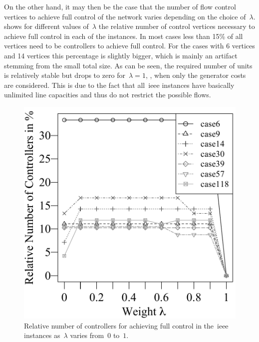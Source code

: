 On the other hand, it may then be the case that the number of flow control
vertices to achieve full control of the network varies depending on the choice
of~$\lambda$.  shows for different
values of~$\lambda$ the relative number of control vertices necessary to achieve
full control in each of the instances. In most cases less than 15\% of all
vertices need to be controllers to achieve full control.  For the cases with 6
vertices and 14 vertices this percentage is slightly bigger, which is mainly an
artifact stemming from the small total size.  As can be seen, the required
number of units is relatively stable but drops to zero for~$\lambda = 1$, \ie,
when only the generator costs are considered. This is due to the fact that
all~\gls{ieee} instances have basically unlimited line capacities and thus
do not restrict the possible flows.

\begin{figure}[tb!]%
    \centering
    \includegraphics[width=\plotscaleOne\linewidth, trim=0cm 0cm 0cm 0cm]{factsplacement/plots/plotControllerVsWeight.pdf}
    \caption[Comparison of the relative number of controller.]{Relative number
    of controllers for achieving full control in the~\gls{ieee} instances
    as~$\lambda$ varies from~$0$ to~$1$.}%
    \label{ch:facts:fig:plot-controller-weight}%
\end{figure}%

